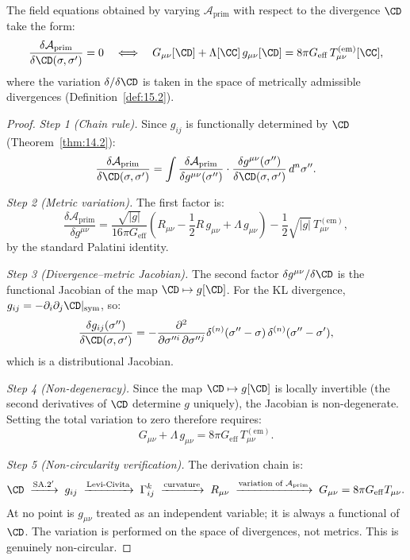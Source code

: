 \begin{theorem}\label{thm:15.8c}
The field equations obtained by varying $\mathcal{A}_{\mathrm{prim}}$
with respect to the divergence $\CD$ take the form:
\begin{equation}\label{eq:field-eq-primary}
  \frac{\delta\mathcal{A}_{\mathrm{prim}}}{\delta\CD(\sigma, \sigma')}
  = 0 \quad \Longleftrightarrow \quad
  G_{\mu\nu}[\CD] + \Lambda[\CC]\,g_{\mu\nu}[\CD]
  = 8\pi G_{\mathrm{eff}}\,T_{\mu\nu}^{(\mathrm{em})}[\CC],
\end{equation}
where the variation $\delta/\delta\CD$ is taken in the space of
metrically admissible divergences (Definition~\ref{def:15.2}).
\end{theorem}

\begin{proof}
\emph{Step 1 (Chain rule).}  Since $g_{ij}$ is functionally determined
by $\CD$ (Theorem~\ref{thm:14.2}):
\[
  \frac{\delta\mathcal{A}_{\mathrm{prim}}}{\delta\CD(\sigma, \sigma')}
  = \int \frac{\delta\mathcal{A}_{\mathrm{prim}}}{\delta g^{\mu\nu}(\sigma'')}
  \cdot \frac{\delta g^{\mu\nu}(\sigma'')}
  {\delta\CD(\sigma, \sigma')}\,d^n\sigma''.
\]

\emph{Step 2 (Metric variation).}  The first factor is:
\[
  \frac{\delta\mathcal{A}_{\mathrm{prim}}}{\delta g^{\mu\nu}}
  = \frac{\sqrt{|g|}}{16\pi G_{\mathrm{eff}}}
  \left(R_{\mu\nu} - \frac{1}{2}R\,g_{\mu\nu}
  + \Lambda\,g_{\mu\nu}\right)
  - \frac{1}{2}\sqrt{|g|}\,T_{\mu\nu}^{(\mathrm{em})},
\]
by the standard Palatini identity.

\emph{Step 3 (Divergence--metric Jacobian).}  The second factor
$\delta g^{\mu\nu}/\delta\CD$ is the functional Jacobian of the map
$\CD \mapsto g[\CD]$.  For the KL divergence,
$g_{ij} = -\partial_i\partial_j \CD|_{\mathrm{sym}}$, so:
\[
  \frac{\delta g_{ij}(\sigma'')}{\delta \CD(\sigma, \sigma')}
  = -\frac{\partial^2}{\partial\sigma''^i\,\partial\sigma''^j}
  \delta^{(n)}(\sigma'' - \sigma)\,\delta^{(n)}(\sigma'' - \sigma'),
\]
which is a distributional Jacobian.

\emph{Step 4 (Non-degeneracy).}  Since the map $\CD \mapsto g[\CD]$ is
locally invertible (the second derivatives of $\CD$ determine $g$
uniquely), the Jacobian is non-degenerate.  Setting the total variation
to zero therefore requires:
\[
  G_{\mu\nu} + \Lambda\,g_{\mu\nu}
  = 8\pi G_{\mathrm{eff}}\,T_{\mu\nu}^{(\mathrm{em})}.
\]

\emph{Step 5 (Non-circularity verification).}  The derivation chain is:
\[
  \CD \;\xrightarrow{\text{SA.2}'}\; g_{ij}
  \;\xrightarrow{\text{Levi-Civita}}\; \Gamma^k_{ij}
  \;\xrightarrow{\text{curvature}}\; R_{\mu\nu}
  \;\xrightarrow{\text{variation of } \mathcal{A}_{\mathrm{prim}}}
  \; G_{\mu\nu} = 8\pi G_{\mathrm{eff}} T_{\mu\nu}.
\]
At no point is $g_{\mu\nu}$ treated as an independent variable; it is
always a functional of $\CD$.  The variation is performed on the space
of divergences, not metrics.  This is genuinely non-circular.
\end{proof}

